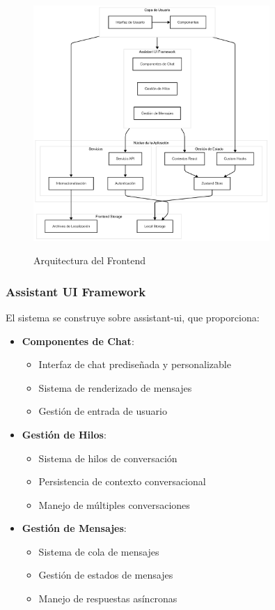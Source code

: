 \begin{figure}[H]
	\centering
	\caption{Arquitectura del Frontend}
	\includegraphics[width=0.8\textwidth]{figuras/frontend.png}
	\label{fig:arquitectura-frontend}
\end{figure}

\subsubsection{Assistant UI Framework}
\label{assistant-ui}

El sistema se construye sobre \gls{assistant-ui}, que proporciona:

\begin{itemize}
	\item \textbf{Componentes de Chat}:
	      \begin{itemize}
		      \item Interfaz de chat prediseñada y personalizable
		      \item Sistema de renderizado de mensajes
		      \item Gestión de entrada de usuario
	      \end{itemize}

	\item \textbf{Gestión de Hilos}:
	      \begin{itemize}
		      \item Sistema de hilos de conversación
		      \item Persistencia de contexto conversacional
		      \item Manejo de múltiples conversaciones
	      \end{itemize}

	\item \textbf{Gestión de Mensajes}:
	      \begin{itemize}
		      \item Sistema de cola de mensajes
		      \item Gestión de estados de mensajes
		      \item Manejo de respuestas asíncronas
	      \end{itemize}
\end{itemize}
